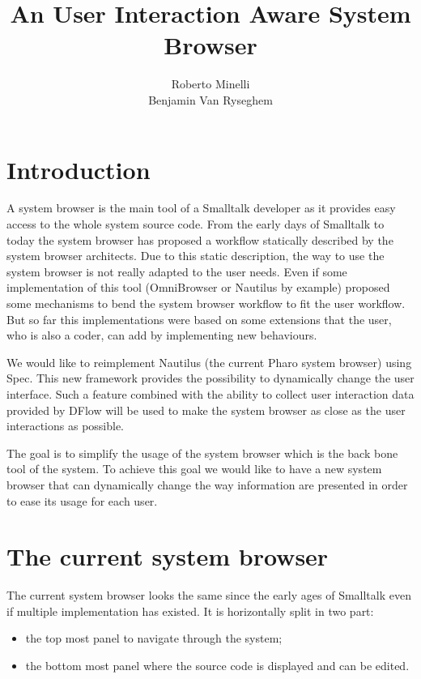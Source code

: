 \documentclass[12pt]{article}
\begin{document}
\title{An User Interaction Aware System Browser}
\author{Roberto Minelli\\Benjamin Van Ryseghem}
\maketitle

\section{Introduction}

A system browser is the main tool of a Smalltalk developer as it provides easy access to the whole system source code.
From the early days of Smalltalk to today the system browser has proposed a workflow statically described by the system browser architects.
Due to this static description, the way to use the system browser is not really adapted to the user needs. 
Even if some implementation of this tool (OmniBrowser or Nautilus by example) proposed some mechanisms to bend the system browser workflow to fit the user workflow.
But so far this implementations were based on some extensions that the user, who is also a coder, can add by implementing new behaviours.

We would like to reimplement Nautilus (the current Pharo system browser) using Spec.
This new framework provides the possibility to dynamically change the user interface.
Such a feature combined with the ability to collect user interaction data provided by DFlow will be used to make the system browser 
as close as the user interactions as possible.

The goal is to simplify the usage of the system browser which is the back bone tool of the system. 
To achieve this goal we would like to have a new system browser that can dynamically change the way information are presented in order to ease its usage for each user.


\section{The current system browser}

The current system browser looks the same since the early ages of Smalltalk even if multiple implementation has existed.
It is horizontally split in two part:
\begin{itemize}
	\item the top most panel to navigate through the system;
	\item the bottom most panel where the source code is displayed and can be edited.
\end{itemize}
\end{document}
